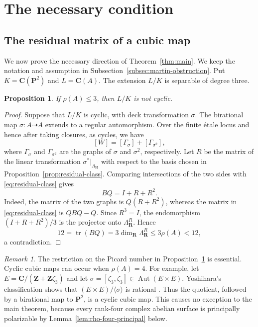 \documentclass[12pt]{amsart}
\numberwithin{equation}{section}
\newtheorem{proposition}[theorem]{Proposition}
\theoremstyle{definition}
\theoremstyle{remark}
\newtheorem{remark}[theorem]{Remark}
\newcommand{\C}{\mathbf C}
\newcommand{\Z}{\mathbf Z}
\newcommand{\R}{\mathbf R}
\newcommand{\PP}{\mathbf P}
\newcommand{\tr}{\operatorname{tr}}
\begin{document}
\section{The necessary condition}\label{sec:necessary}
\subsection{The residual matrix of a cubic map}
\label{sec:residual}

We now prove the necessary direction of Theorem~\ref{thm:main}.  We keep the notation and assumption in Subsection~\ref{subsec:martin-obstruction}.
Put \(K=\C(\PP^2)\) and \(L=\C(A)\).  The extension \(L/K\) is
separable of degree three.

\begin{proposition}\label{prop:cyclic-low-rank}
If \(\rho(A)\le3\), then \(L/K\) is not cyclic.
\end{proposition}

\begin{proof}
Suppose that \(L/K\) is cyclic, with deck transformation \(\sigma\).
The birational map \(\sigma:A\dashrightarrow A\) extends to a regular
automorphism.  Over the finite \'etale locus and hence after taking
closures, as cycles, we have
\[
                         [W]=[\Gamma_\sigma]+[\Gamma_{\sigma^2}],
\]
where $\Gamma_\sigma$ and $\Gamma_{\sigma^2}$ are the graphs of $\sigma$ and $\sigma^2$, respectively.
Let \(R\) be the matrix of the linear transformation $\sigma^*|_{\Lambda_{\R}}$ with respect to the basis chosen in Proposition~\ref{prop:residual-class}.  Comparing intersections of
the two sides with \eqref{eq:residual-class} gives
\[
                         BQ=I+R+R^2.
\]
Indeed, the matrix of the two graphs is \(Q(R+R^2)\), whereas
the matrix in \eqref{eq:residual-class} is \(QBQ-Q\).
Since \(R^3=I\), the endomorphism
\((I+R+R^2)/3\) is the projector onto \(\Lambda_{\R}^R\).  Hence
\[
 12=\tr(BQ)=3\dim_{\R}\Lambda_{\R}^R\le3\rho(A)<12,
\]
a contradiction.
\end{proof}

\begin{remark}\label{rem:cyclic-rank-four}
The restriction on the Picard number in
Proposition~\ref{prop:cyclic-low-rank} is essential.  Cyclic cubic maps
can occur when \(\rho(A)=4\).  For example, let
$E=\C/(\Z+\Z\zeta_3)$ and let
$\sigma=[\zeta_3,\zeta_3]\in\operatorname{Aut}(E\times E)$.
Yoshihara's classification shows that
$(E\times E)/\langle\sigma\rangle$ is rational
\cite[Theorem~2.1, pp.~136--137, and Note~2.5, p.~138]
{YoshiharaQuotients}.  Thus the quotient, followed by a birational map
to $\PP^2$, is a cyclic cubic map.  This causes no exception to the main
theorem, because every rank-four complex abelian surface is principally
polarizable by Lemma~\ref{lem:rho-four-principal} below.
\end{remark}
\end{document}
